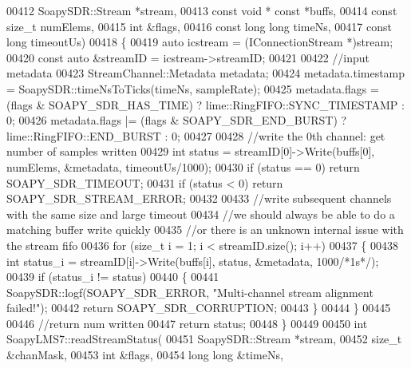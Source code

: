 \begin{DoxyCode}
{00412     SoapySDR::Stream *stream,
00413     \textcolor{keyword}{const} \textcolor{keywordtype}{void} * \textcolor{keyword}{const} *buffs,
00414     \textcolor{keyword}{const} \textcolor{keywordtype}{size\_t} numElems,
00415     \textcolor{keywordtype}{int} &flags,
00416     \textcolor{keyword}{const} \textcolor{keywordtype}{long} \textcolor{keywordtype}{long} timeNs,
00417     \textcolor{keyword}{const} \textcolor{keywordtype}{long} timeoutUs)
00418 \{
00419     \textcolor{keyword}{auto} icstream = (IConnectionStream *)stream;
00420     \textcolor{keyword}{const} \textcolor{keyword}{auto} &streamID = icstream->streamID;
00421 
00422     \textcolor{comment}{//input metadata}
00423     StreamChannel::Metadata metadata;
00424     metadata.timestamp = SoapySDR::timeNsToTicks(timeNs, sampleRate);
00425     metadata.flags = (flags & SOAPY_SDR_HAS_TIME) ? 
      lime::RingFIFO::SYNC_TIMESTAMP : 0;
00426     metadata.flags |= (flags & SOAPY_SDR_END_BURST) ? lime::RingFIFO::END_BURST : 0;
00427 
00428     \textcolor{comment}{//write the 0th channel: get number of samples written}
00429     \textcolor{keywordtype}{int} status = streamID[0]->Write(buffs[0], numElems, &metadata, timeoutUs/1000);
00430     \textcolor{keywordflow}{if} (status == 0) \textcolor{keywordflow}{return} SOAPY_SDR_TIMEOUT;
00431     \textcolor{keywordflow}{if} (status < 0) \textcolor{keywordflow}{return} SOAPY_SDR_STREAM_ERROR;
00432 
00433     \textcolor{comment}{//write subsequent channels with the same size and large timeout}
00434     \textcolor{comment}{//we should always be able to do a matching buffer write quickly}
00435     \textcolor{comment}{//or there is an unknown internal issue with the stream fifo}
00436     \textcolor{keywordflow}{for} (\textcolor{keywordtype}{size\_t} i = 1; i < streamID.size(); i++)
00437     \{
00438         \textcolor{keywordtype}{int} status\_i = streamID[i]->Write(buffs[i], status, &metadata, 1000\textcolor{comment}{/*1s*/});
00439         \textcolor{keywordflow}{if} (status\_i != status)
00440         \{
00441             SoapySDR::logf(SOAPY_SDR_ERROR, \textcolor{stringliteral}{"Multi-channel stream alignment failed!"});
00442             \textcolor{keywordflow}{return} SOAPY_SDR_CORRUPTION;
00443         \}
00444     \}
00445 
00446     \textcolor{comment}{//return num written}
00447     \textcolor{keywordflow}{return} status;
00448 \}
00449 
00450 \textcolor{keywordtype}{int} SoapyLMS7::readStreamStatus(
00451     SoapySDR::Stream *stream,
00452     \textcolor{keywordtype}{size\_t} &chanMask,
00453     \textcolor{keywordtype}{int} &flags,
00454     \textcolor{keywordtype}{long} \textcolor{keywordtype}{long} &timeNs,
}
\end{DoxyCode}
